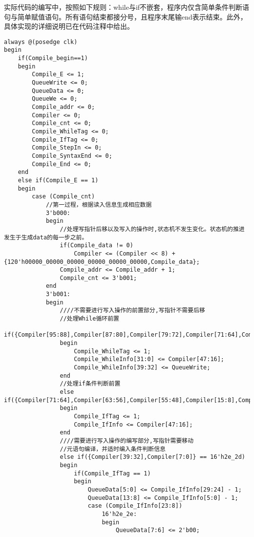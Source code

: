\documentclass[lang=cn,11pt,a4paper]{elegantpaper}
\begin{document}
实际代码的编写中，按照如下规则：while与if不嵌套，程序内仅含简单条件判断语句与简单赋值语句。所有语句结束都接分号，且程序末尾输end表示结束。此外，具体实现的详细说明已在代码注释中给出。

\begin{lstlisting}
always @(posedge clk)
begin
    if(Compile_begin==1)
    begin
        Compile_E <= 1;
        QueueWrite <= 0;
        QueueData <= 0;
        QueueWe <= 0;
        Compile_addr <= 0;
        Compiler <= 0;
        Compile_cnt <= 0;
        Compile_WhileTag <= 0;
        Compile_IfTag <= 0;
        Compile_StepIn <= 0;
        Compile_SyntaxEnd <= 0;
        Compile_End <= 0;
    end
    else if(Compile_E == 1)
    begin
        case (Compile_cnt)
            //第一过程，根据读入信息生成相应数据
            3'b000:
            begin
                //处理写指针后移以及写入的操作时,状态机不发生变化。状态机的推进发生于生成data的每一步之前。
                if(Compile_data != 0)
                    Compiler <= (Compiler << 8) + {120'h00000_00000_00000_00000_00000_00000,Compile_data};
                Compile_addr <= Compile_addr + 1;
                Compile_cnt <= 3'b001;
            end
            3'b001:
            begin
                ////不需要进行写入操作的前置部分,写指针不需要后移
                //处理While循环前置
                if({Compiler[95:88],Compiler[87:80],Compiler[79:72],Compiler[71:64],Compiler[63:56],Compiler[55:48],Compiler[15:8],Compiler[7:0]}==64'h17_08_09_0c_05_29_2a_2b)
                begin
                    Compile_WhileTag <= 1;
                    Compile_WhileInfo[31:0] <= Compiler[47:16];
                    Compile_WhileInfo[39:32] <= QueueWrite;
                end
                //处理if条件判断前置
                else if({Compiler[71:64],Compiler[63:56],Compiler[55:48],Compiler[15:8],Compiler[7:0]}==40'h09_06_29_2a_2b)
                begin
                    Compile_IfTag <= 1;
                    Compile_IfInfo <= Compiler[47:16];
                end
                ////需要进行写入操作的编写部分,写指针需要移动
                //元语句编译，并适时编入条件判断信息
                else if({Compiler[39:32],Compiler[7:0]} == 16'h2e_2d)	
                begin
                    if(Compile_IfTag == 1)
                    begin
                        QueueData[5:0] <= Compile_IfInfo[29:24] - 1;
                        QueueData[13:8] <= Compile_IfInfo[5:0] - 1;
                        case (Compile_IfInfo[23:8])
                            16'h2e_2e:
                            begin
                                QueueData[7:6] <= 2'b00;

\end{lstlisting}
\end{document}
